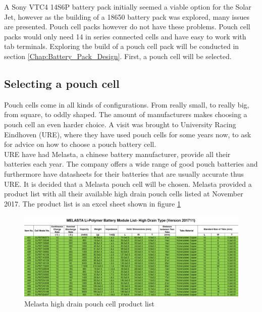 A Sony VTC4 14S6P battery pack initially seemed a viable option for the Solar Jet, however as the building of a 18650 battery pack was explored, many issues are presented. Pouch cell packs however do not have these problems. Pouch cell packs would only need 14 in series connected cells and have easy to work with tab terminals. Exploring the build of a pouch cell pack will be conducted in section \ref{Chap:Battery_Pack_Design}. First, a pouch cell will be selected.

\subsection{Selecting a pouch cell}
\label{Selecting_a_pouch_cell}
Pouch cells come in all kinds of configurations. From really small, to really big, from square, to oddly shaped. The amount of manufacturers makes choosing a pouch cell an even harder choice. A visit was brought to University Racing Eindhoven (URE), where they have used pouch cells for some years now, to ask for advice on how to choose a pouch battery cell.\\
URE have had Melasta, a chinese battery manufacturer, provide all their batteries each year. The company offers a wide range of good pouch batteries and furthermore have datasheets for their batteries that are usually accurate thus URE. It is decided that a Melasta pouch cell will be chosen.
\newpage
Melasta provided a product list with all their available high drain pouch cells listed at November 2017. The product list is an excel sheet shown in figure \ref{Fig:melasta_productlist}

\begin{figure} [H]
	\centering
	\includegraphics[width=1\linewidth]{Figures/melasta_datasheet.PNG}
	\caption{Melasta high drain pouch cell product list}
   \label{Fig:melasta_productlist}
\end{figure}

